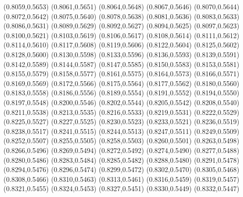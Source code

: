 \PST@Cross(0.8059,0.5653)
\PST@Cross(0.8061,0.5651)
\PST@Cross(0.8064,0.5648)
\PST@Cross(0.8067,0.5646)
\PST@Cross(0.8070,0.5644)
\PST@Cross(0.8072,0.5642)
\PST@Cross(0.8075,0.5640)
\PST@Cross(0.8078,0.5638)
\PST@Cross(0.8081,0.5636)
\PST@Cross(0.8083,0.5633)
\PST@Cross(0.8086,0.5631)
\PST@Cross(0.8089,0.5629)
\PST@Cross(0.8092,0.5627)
\PST@Cross(0.8094,0.5625)
\PST@Cross(0.8097,0.5623)
\PST@Cross(0.8100,0.5621)
\PST@Cross(0.8103,0.5619)
\PST@Cross(0.8106,0.5617)
\PST@Cross(0.8108,0.5614)
\PST@Cross(0.8111,0.5612)
\PST@Cross(0.8114,0.5610)
\PST@Cross(0.8117,0.5608)
\PST@Cross(0.8119,0.5606)
\PST@Cross(0.8122,0.5604)
\PST@Cross(0.8125,0.5602)
\PST@Cross(0.8128,0.5600)
\PST@Cross(0.8130,0.5598)
\PST@Cross(0.8133,0.5596)
\PST@Cross(0.8136,0.5593)
\PST@Cross(0.8139,0.5591)
\PST@Cross(0.8142,0.5589)
\PST@Cross(0.8144,0.5587)
\PST@Cross(0.8147,0.5585)
\PST@Cross(0.8150,0.5583)
\PST@Cross(0.8153,0.5581)
\PST@Cross(0.8155,0.5579)
\PST@Cross(0.8158,0.5577)
\PST@Cross(0.8161,0.5575)
\PST@Cross(0.8164,0.5573)
\PST@Cross(0.8166,0.5571)
\PST@Cross(0.8169,0.5569)
\PST@Cross(0.8172,0.5566)
\PST@Cross(0.8175,0.5564)
\PST@Cross(0.8177,0.5562)
\PST@Cross(0.8180,0.5560)
\PST@Cross(0.8183,0.5558)
\PST@Cross(0.8186,0.5556)
\PST@Cross(0.8189,0.5554)
\PST@Cross(0.8191,0.5552)
\PST@Cross(0.8194,0.5550)
\PST@Cross(0.8197,0.5548)
\PST@Cross(0.8200,0.5546)
\PST@Cross(0.8202,0.5544)
\PST@Cross(0.8205,0.5542)
\PST@Cross(0.8208,0.5540)
\PST@Cross(0.8211,0.5538)
\PST@Cross(0.8213,0.5535)
\PST@Cross(0.8216,0.5533)
\PST@Cross(0.8219,0.5531)
\PST@Cross(0.8222,0.5529)
\PST@Cross(0.8225,0.5527)
\PST@Cross(0.8227,0.5525)
\PST@Cross(0.8230,0.5523)
\PST@Cross(0.8233,0.5521)
\PST@Cross(0.8236,0.5519)
\PST@Cross(0.8238,0.5517)
\PST@Cross(0.8241,0.5515)
\PST@Cross(0.8244,0.5513)
\PST@Cross(0.8247,0.5511)
\PST@Cross(0.8249,0.5509)
\PST@Cross(0.8252,0.5507)
\PST@Cross(0.8255,0.5505)
\PST@Cross(0.8258,0.5503)
\PST@Cross(0.8260,0.5501)
\PST@Cross(0.8263,0.5498)
\PST@Cross(0.8266,0.5496)
\PST@Cross(0.8269,0.5494)
\PST@Cross(0.8272,0.5492)
\PST@Cross(0.8274,0.5490)
\PST@Cross(0.8277,0.5488)
\PST@Cross(0.8280,0.5486)
\PST@Cross(0.8283,0.5484)
\PST@Cross(0.8285,0.5482)
\PST@Cross(0.8288,0.5480)
\PST@Cross(0.8291,0.5478)
\PST@Cross(0.8294,0.5476)
\PST@Cross(0.8296,0.5474)
\PST@Cross(0.8299,0.5472)
\PST@Cross(0.8302,0.5470)
\PST@Cross(0.8305,0.5468)
\PST@Cross(0.8308,0.5466)
\PST@Cross(0.8310,0.5463)
\PST@Cross(0.8313,0.5461)
\PST@Cross(0.8316,0.5459)
\PST@Cross(0.8319,0.5457)
\PST@Cross(0.8321,0.5455)
\PST@Cross(0.8324,0.5453)
\PST@Cross(0.8327,0.5451)
\PST@Cross(0.8330,0.5449)
\PST@Cross(0.8332,0.5447)
